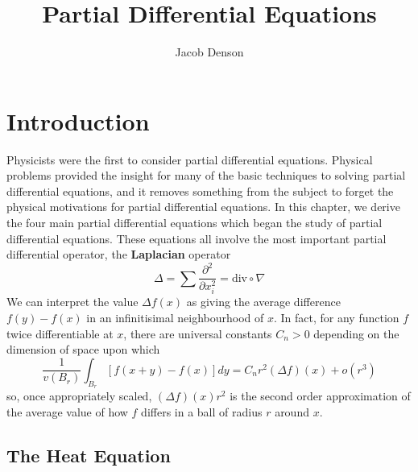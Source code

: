 

\title{Partial Differential Equations}
\author{Jacob Denson}




\maketitle

\tableofcontents


\chapter{Introduction}

Physicists were the first to consider partial differential equations. Physical problems provided the insight for many of the basic techniques to solving partial differential equations, and it removes something from the subject to forget the physical motivations for partial differential equations. In this chapter, we derive the four main partial differential equations which began the study of partial differential equations. These equations all involve the most important partial differential operator, the {\bf Laplacian} operator
%
\[ \Delta = \sum \frac{\partial^2}{\partial x_i^2} = \text{div} \circ \nabla \]
%
We can interpret the value $\Delta f(x)$ as giving the average difference $f(y) - f(x)$ in an infinitisimal neighbourhood of $x$. In fact, for any function $f$ twice differentiable at $x$, there are universal constants $C_n > 0$ depending on the dimension of space upon which
%
\[ \frac{1}{v(B_r)} \int_{B_r} [f(x+y) - f(x)] dy = C_n r^2 (\Delta f)(x) + o(r^3) \]
%
so, once appropriately scaled, $(\Delta f)(x) r^2$ is the second order approximation of the average value of how $f$ differs in a ball of radius $r$ around $x$.

\section{The Heat Equation}


